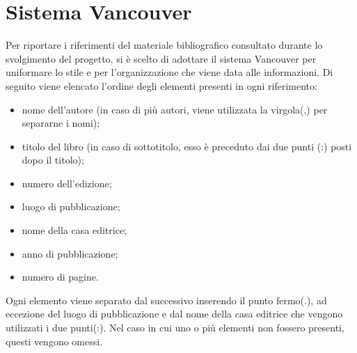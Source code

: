 \section{Sistema Vancouver}
Per riportare i riferimenti del materiale bibliografico consultato durante lo 
svolgimento del progetto, si è scelto di adottare il sistema Vancouver per 
uniformare lo stile e per l'organizzazione che viene data alle informazioni.
Di seguito viene elencato l'ordine degli elementi presenti in ogni riferimento:
\begin{itemize}
	\item nome dell'autore (in caso di più autori, viene utilizzata la virgola(,) per 
		separarne i nomi);
	\item titolo del libro (in caso di sottotitolo, esso è preceduto dai due punti
		(:) posti dopo il	titolo);
	\item numero dell'edizione;
	\item luogo di pubblicazione;
	\item nome della casa editrice;
	\item anno di pubblicazione;
	\item numero di pagine.
\end{itemize}

Ogni elemento viene separato dal successivo inserendo il punto fermo(.), ad eccezione 
del luogo di pubblicazione e dal nome della casa editrice che vengono utilizzati i due 
punti(:). Nel caso in cui uno o più elementi non fossero presenti, questi vengono 
omessi.
